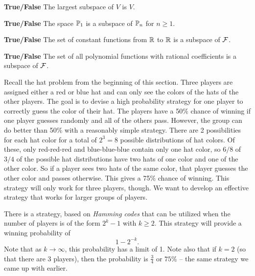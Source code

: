 \item \textbf{True/False} The largest subspace of $V$ is $V$.

\item \textbf{True/False} The space $\mathbb{P}_1$ is a subspace of $\mathbb{P}_n$ for $n \geq 1$.



\item \textbf{True/False} The set of constant functions from $\mathbb{R}$ to $\mathbb{R}$ is a subspace of $\mathcal{F}$.

\item \textbf{True/False} The set of all polynomial functions with rational coefficients is a subspace of $\mathcal{F}$.

\ea	
	
\ee

\label{sec:proj_hamming_hat_puzzle}

Recall the hat problem from the beginning of this section. Three players are assigned either a red or blue hat and can only see the colors of the hats of the other players. The goal is to devise a high probability strategy for one player to correctly guess the color of their hat. The players have a 50\% chance of winning if one player guesses randomly and all of the others pass. However, the group can do better than 50\% with a reasonably simple strategy. There are 2 possibilities for each hat color for a total of $2^3 = 8$ possible distributions of hat colors. Of these, only red-red-red and blue-blue-blue contain only one hat color, so $6/8$ of $3/4$ of the possible hat distributions have two hats of one color and one of the other color. So if a player sees two hats of the same color, that player guesses the other color and passes otherwise. This gives a 75\% chance of winning. This strategy will only work for three players, though. We want to develop an effective strategy that works for larger groups of players. 

There is a strategy, based on \emph{Hamming codes} that can be utilized when the number of players is of the form $2^k-1$ with $k \geq 2$. This strategy will provide a winning probability of
\[1 - 2^{-k}.\]
Note that as $k \to \infty$, this probability has a limit of 1. Note also that if $k=2$ (so that there are 3 players), then the probability is $\frac{3}{4}$ or $75\%$ -- the same strategy we came up with earlier. 

